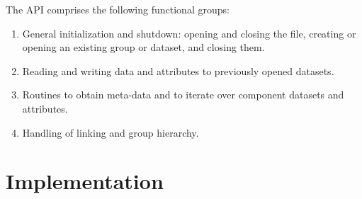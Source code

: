 \documentclass[12pt]{article}
\begin{document}
The API comprises the following functional groups:

\begin{enumerate}
\item General initialization and shutdown: opening and closing the file,
      creating or opening an existing group or dataset,  and closing them.
\item Reading and writing data and attributes to previously opened datasets.
\item Routines to obtain meta-data and to iterate over component datasets and attributes.
\item Handling of linking and group hierarchy.
\end{enumerate}



\section{Implementation}
\end{document}
